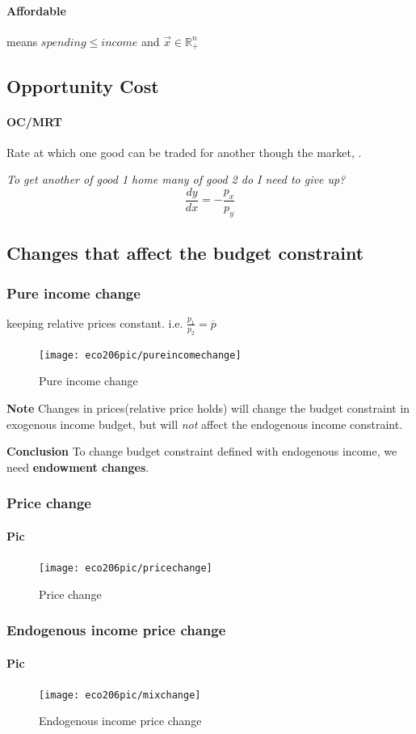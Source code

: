 \documentclass{article}
\begin{document}
	\paragraph{Affordable} means $spending \leq income$ and $\vec{x} \in \mathbb{R}^n_{+}$
	\subsection{Opportunity Cost}
	\paragraph{OC/MRT} Rate at which one good can be traded for another though the market, .
	
	\emph{To get another  of good 1 home many  of good 2 do I need to give up?}
	\[
		\frac{dy}{dx} = -\frac{p_x}{p_y}
	\]
	\subsection{Changes that affect the budget constraint}
	\subsubsection{Pure income change} keeping relative prices constant. i.e. $\frac{p_1}{p_2} = \overline{p}$
	\begin{figure}[h]
		\centering
		\texttt{[image: eco206pic/pureincomechange]}
		\caption{Pure income change}
	\end{figure}
	
	
	\textbf{Note} Changes in prices(relative price holds) will change the budget constraint in exogenous income budget, but will \emph{not} affect the endogenous income constraint.
	
	\textbf{Conclusion} To change budget constraint defined with endogenous income, we need \textbf{endowment changes}.
	
	\subsubsection{Price change}
	\paragraph{Pic}
	\begin{figure}[h]
		\centering
		\texttt{[image: eco206pic/pricechange]}
		\caption{Price change}
	\end{figure}
	
	\subsubsection{Endogenous income price change}
	\paragraph{Pic}
	\begin{figure}[h]
		\centering
		\texttt{[image: eco206pic/mixchange]}
		\caption{Endogenous income price change}
	\end{figure}
\end{document}
